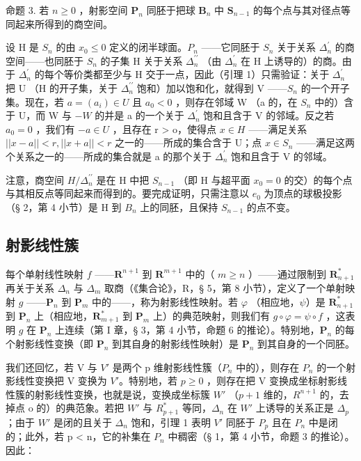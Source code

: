 命题 3. 若 \(n \geqslant 0\) ，射影空间 \(\mathbf{P}_n\) 同胚于把球 \(\mathbf{B}_n\) 中 \(\mathbf{S}_{n-1}\) 的每个点与其对径点等同起来所得到的商空间。

设 H 是 \(S_{n}\) 的由 \(x_{0} \leqslant 0\) 定义的闭半球面。\(P_{n}\) ——它同胚于 \(S_{n}\) 关于关系 \(\Delta_{n}^{\prime}\) 的商空间——也同胚于 \(S_{n}\) 的子集 H 关于关系 \(\Delta_{n}^{\prime\prime}\) （由 \(\Delta_{n}^{\prime}\) 在 H 上诱导的）的商。由于 \(\Delta_{n}^{\prime}\) 的每个等价类都至少与 H 交于一点，因此（引理 1）只需验证：关于 \(\Delta_{n}^{\prime}\) 把 U （H 的开子集，关于 \(\Delta_{n}^{\prime\prime}\) 饱和）加以饱和化，就得到 V ——\(S_{n}\) 的一个开子集。现在，若 \(a = (a_{i}) \in U\) 且 \(a_{0} < 0\) ，则存在邻域 W （a 的，在 \(S_{n}\) 中的）含于 U，而 W 与 \(-W\) 的并是 a 的一个关于 \(\Delta_{n}^{\prime}\) 饱和且含于 V 的邻域。反之若 \(a_{0} = 0\) ，我们有 \(- a \in U\) ，且存在 r \textgreater{} o，使得点 \(x \in H\) ——满足关系 \(||x-a||<r, ||x+a||<r\) 之一的——所成的集合含于 U；点 \(x\in S_{n}\) ——满足这两个关系之一的——所成的集合就是 a 的那个关于 \(\Delta_{n}^{\prime}\) 饱和且含于 V 的邻域。

注意，商空间 \(H/\Delta_{n}^{\prime\prime}\) 是在 H 中把 \(S_{n-1}\) （即 H 与超平面 \(x_{0}=0\) 的交）的每个点与其相反点等同起来而得到的。要完成证明，只需注意以 \(e_{0}\) 为顶点的球极投影（§ 2，第 4 小节）是 H 到 \(B_{n}\) 上的同胚，且保持 \(S_{n-1}\) 的点不变。

\subsection{射影线性簇}

每个单射线性映射 \(f\) ——\(\mathbf{R}^{n+1}\) 到 \(\mathbf{R}^{m+1}\) 中的（ \(m \geqslant n\) ）——通过限制到 \(\mathbf{R}_{n+1}^*\) 再关于关系 \(\Delta_n\) 与 \(\Delta_m\) 取商（《集合论》，R，§ 5，第 8 小节），定义了一个单射映射 \(g\) ——\(\mathbf{P}_n\) 到 \(\mathbf{P}_m\) 中的——，称为射影线性映射。若 \(\varphi\) （相应地，\(\psi\)）是 \(\mathbf{R}_{n+1}^*\) 到 \(\mathbf{P}_n\) 上（相应地，\(\mathbf{R}_{m+1}^*\) 到 \(\mathbf{P}_m\) 上）的典范映射，则我们有 \(g \circ \varphi = \psi \circ f\) ，这表明 \(g\) 在 \(\mathbf{P}_n\) 上连续（第 I 章，§ 3，第 4 小节，命题 6 的推论）。特别地，\(\mathbf{P}_n\) 的每个射影线性变换（即 \(\mathbf{P}_n\) 到其自身的射影线性映射）是 \(\mathbf{P}_n\) 到其自身的一个同胚。

我们还回忆，若 V 与 \(V'\) 是两个 p 维射影线性簇（\(P_{n}\) 中的），则存在 \(P_{n}\) 的一个射影线性变换把 V 变换为 \(V'\)。特别地，若 \(p \geqslant 0\) ，则存在把 V 变换成坐标射影线性簇的射影线性变换，也就是说，变换成坐标簇 \(W'\) （\(p + 1\) 维的，\(R^{n+1}\) 的，去掉点 o 的）的典范象。若把 \(W'\) 与 \(R_{p+1}^{*}\) 等同，\(\Delta_{n}\) 在 \(W'\) 上诱导的关系正是 \(\Delta_{p}\) ；由于 \(W'\) 是闭的且关于 \(\Delta_{n}\) 饱和，引理 1 表明 \(V'\) 同胚于 \(P_{p}\) 且在 \(P_{n}\) 中是闭的；此外，若 p \textless{} n，它的补集在 \(P_{n}\) 中稠密（§ 1，第 4 小节，命题 3 的推论）。因此：

